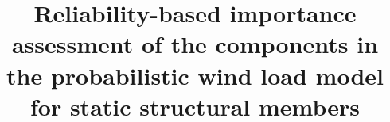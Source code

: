 %
%
%
%
%
%
%
%


\title{Reliability-based importance assessment of the components in the probabilistic wind load model for static structural members}
\maketitle



